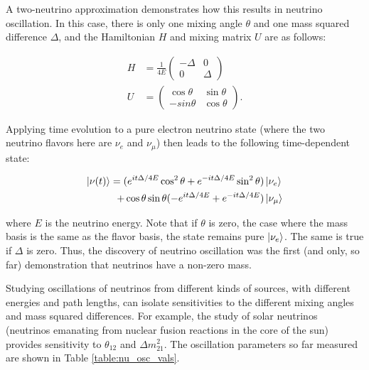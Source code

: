 A two-neutrino approximation demonstrates how this results in neutrino oscillation.  In this case, there is only one mixing angle $\theta$ and one mass squared difference $\Delta$, and the Hamiltonian $H$ and mixing matrix $U$ are as follows:

\begin{equation}
\begin{aligned}
H &= \frac{1}{4 E} \begin{pmatrix}
-\Delta & 0 \\
0 & \Delta
\end{pmatrix} \\
U &= \begin{pmatrix}
\cos \theta & \sin \theta \\
-sin \theta & \cos \theta
\end{pmatrix}.
\end{aligned}
\end{equation}

\noindent
Applying time evolution to a pure electron neutrino state (where the two neutrino flavors here are $\nu_{e}$ and $\nu_{\mu}$) then leads to the following time-dependent state:

\begin{equation}
\begin{aligned}
\ket{\nu(t)} = (e^{i t \Delta / 4 E} \cos^{2} \theta + e^{-i t \Delta / 4 E} \sin^{2} \theta) &\ket{\nu_{e}} \\ + \cos \theta \sin \theta (-e^{i t \Delta / 4 E} + e^{-i t \Delta / 4 E}) &\ket{\nu_{\mu}}
\end{aligned}
\label{eqn:oscilprob}
\end{equation}

\noindent
where $E$ is the neutrino energy.  Note that if $\theta$ is zero, the case where the mass basis is the same as the flavor basis, the state remains pure $\ket{\nu_{e}}$.  The same is true if $\Delta$ is zero.  Thus, the discovery of neutrino oscillation was the first (and only, so far) demonstration that neutrinos have a non-zero mass.

Studying oscillations of neutrinos from different kinds of sources, with different energies and path lengths, can isolate sensitivities to the different mixing angles and mass squared differences.  For example, the study of solar neutrinos (neutrinos emanating from nuclear fusion reactions in the core of the sun) provides sensitivity to $\theta_{12}$ and $\Delta m_{21}^{2}$.  The oscillation parameters so far measured are shown in Table  \ref{table:nu_osc_vals}.

